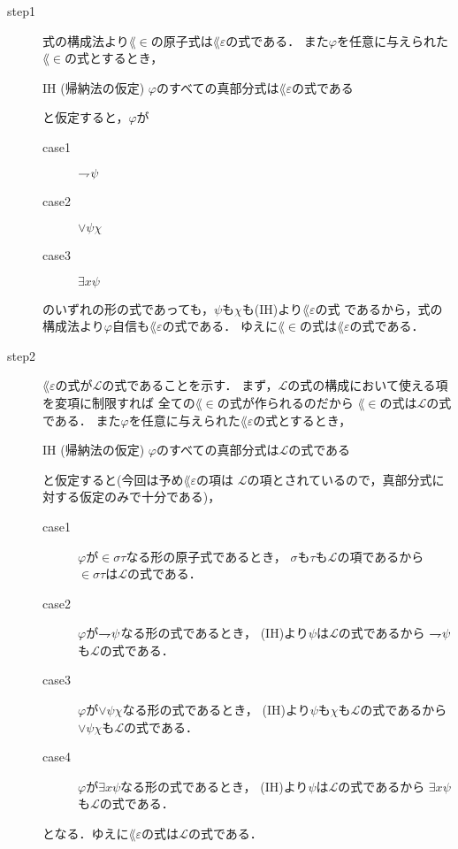 	\begin{metaprf}\mbox{}
		\begin{description}
			\item[step1]
				式の構成法より$\lang{\in}$の原子式は$\lang{\varepsilon}$の式である．
				また$\varphi$を任意に与えられた$\lang{\in}$の式とするとき，
				\begin{itembox}[l]{IH (帰納法の仮定)}
					$\varphi$のすべての真部分式は$\lang{\varepsilon}$の式である
				\end{itembox}
				と仮定すると，$\varphi$が
				\begin{description}
					\item[case1] $\rightharpoondown\hspace{-0.25em} \psi$
					\item[case2] $\vee \psi \chi$
					\item[case3] $\exists x \psi$
				\end{description}
				のいずれの形の式であっても，$\psi$も$\chi$も(IH)より$\lang{\varepsilon}$の式
				であるから，式の構成法より$\varphi$自信も$\lang{\varepsilon}$の式である．
				ゆえに$\lang{\in}$の式は$\lang{\varepsilon}$の式である．
				
			\item[step2]
				$\lang{\varepsilon}$の式が$\mathcal{L}$の式であることを示す．
				まず，$\mathcal{L}$の式の構成において使える項を変項に制限すれば
				全ての$\lang{\in}$の式が作られるのだから
				$\lang{\in}$の式は$\mathcal{L}$の式である．
				また$\varphi$を任意に与えられた$\lang{\varepsilon}$の式とするとき，
				\begin{itembox}[l]{IH (帰納法の仮定)}
					$\varphi$のすべての真部分式は$\mathcal{L}$の式である
				\end{itembox}
				と仮定すると(今回は予め$\lang{\varepsilon}$の項は
				$\mathcal{L}$の項とされているので，真部分式に対する仮定のみで十分である)，
				\begin{description}
					\item[case1] $\varphi$が$\in \sigma \tau$なる形の原子式であるとき，
						$\sigma$も$\tau$も$\mathcal{L}$の項であるから
						$\in \sigma \tau$は$\mathcal{L}$の式である．
						
					\item[case2] $\varphi$が$\rightharpoondown\hspace{-0.25em} \psi$なる形の式であるとき，
						(IH)より$\psi$は$\mathcal{L}$の式であるから
						$\rightharpoondown\hspace{-0.25em} \psi$も$\mathcal{L}$の式である．
						
					\item[case3] $\varphi$が$\vee \psi \chi$なる形の式であるとき，
						(IH)より$\psi$も$\chi$も$\mathcal{L}$の式であるから
						$\vee \psi \chi$も$\mathcal{L}$の式である．
						
					\item[case4] $\varphi$が$\exists x \psi$なる形の式であるとき，
						(IH)より$\psi$は$\mathcal{L}$の式であるから
						$\exists x \psi$も$\mathcal{L}$の式である．
				\end{description}
				となる．ゆえに$\lang{\varepsilon}$の式は$\mathcal{L}$の式である．
				\QED
		\end{description}
	\end{metaprf}
	

